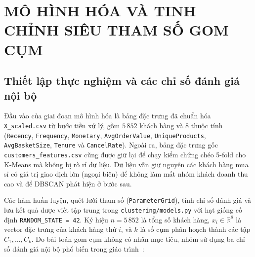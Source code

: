 \documentclass[12pt,a4paper]{article}
\numberwithin{equation}{section}
\numberwithin{table}{section}
\numberwithin{figure}{section}
\begin{document}
\tableofcontents
\clearpage

\setcounter{page}{1}
\setcounter{section}{3}

\section{MÔ HÌNH HÓA VÀ TINH CHỈNH SIÊU THAM SỐ GOM CỤM}

\subsection{Thiết lập thực nghiệm và các chỉ số đánh giá nội bộ}

Đầu vào của giai đoạn mô hình hóa là bảng đặc trưng đã chuẩn hóa \texttt{X\_scaled.csv} từ bước tiền xử lý, gồm $5\,852$ khách hàng và 8 thuộc tính (\texttt{Recency}, \texttt{Frequency}, \texttt{Monetary}, \texttt{AvgOrderValue}, \texttt{UniqueProducts}, \texttt{AvgBasketSize}, \texttt{Tenure} và \texttt{CancelRate}). Ngoài ra, bảng đặc trưng gốc \texttt{customers\_features.csv} cũng được giữ lại để chạy kiểm chứng chéo 5-fold cho K-Means mà không bị rò rỉ dữ liệu. Dữ liệu vẫn giữ nguyên các khách hàng mua sỉ có giá trị giao dịch lớn (ngoại biên) để không làm mất nhóm khách doanh thu cao và để DBSCAN phát hiện ở bước sau.

Các hàm huấn luyện, quét lưới tham số (\texttt{ParameterGrid}), tính chỉ số đánh giá và lưu kết quả được viết tập trung trong \texttt{clustering/models.py} với hạt giống cố định \texttt{RANDOM\_STATE = 42}. Ký hiệu $n = 5\,852$ là tổng số khách hàng, $x_i \in \mathbb{R}^{8}$ là vector đặc trưng của khách hàng thứ $i$, và $k$ là số cụm phân hoạch thành các tập $C_1, \ldots, C_k$. Do bài toán gom cụm không có nhãn mục tiêu, nhóm sử dụng ba chỉ số đánh giá nội bộ phổ biến trong giáo trình~\cite{han2022}:
\end{document}
